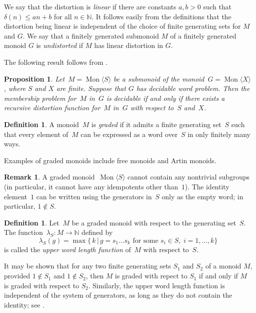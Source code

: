 \documentclass[11pt]{amsart}
\newcommand{\Mgen}[1]{\operatorname{Mon}\bigl\langle #1 \bigr\rangle}
\newcommand{\N}{\mathbb{N}}
\theoremstyle{plain}
\newtheorem{prop}[theorem]{Proposition}
\theoremstyle{definition}
\newtheorem{mydef}[theorem]{Definition}
\newtheorem{remark}[theorem]{Remark}
\begin{document}
We say that the distortion is \emph{linear} if there are constants $a,b>0$ such that $\delta(n) \leq an+b$ for all $n \in \N$. It follows easily from the definitions that the distortion being linear is independent of the choice of finite generating sets for $M$ and $G$. We say that a finitely generated submonoid $M$ of a finitely generated monoid $G$ is \emph{undistorted} if $M$ has linear distortion in $G$.  



The following result follows from 
\cite[Proposition 1.1]{margolis2005distortion}.

\begin{prop}\label{prop: membership problem via distortion}
Let~$M = \Mgen{S}$ be a submonoid of the monoid~$G = \Mgen{X}$, where $S$ and $X$ are finite. 
Suppose that  $G$ has decidable word problem. 
Then the membership problem for~$M$ in~$G$ is decidable if and only if there exists a recursive distortion function for~$M$ in~$G$ with respect to~$S$ and~$X$.
\end{prop}


\begin{mydef}
A monoid~$M$ is \emph{graded} if it admits a finite generating set~$S$ such that every element of~$M$ can be expressed as a word over~$S$ in only finitely many ways.
\end{mydef}
Examples of graded monoids include free monoids and Artin monoids.




\begin{remark}
A graded monoid~$\Mgen{S}$ cannot contain any nontrivial subgroups (in particular, it cannot have any idempotents other than~$1$). The identity element~$1$ can be written using the generators in~$S$ only as the empty word; in particular, $1 \notin S$.
\end{remark}

\begin{mydef}
Let~$M$ be a graded monoid with respect to the generating set~$S$. The function~$\lambda_S \colon M \rightarrow \N$ defined by
\[
\lambda_S(g) = \max\{\,k\,|\, g = s_1 \dots s_k \text{ for some } s_i \in S, \; i = 1, \dots, k\}
\]
is called the \emph{upper word length function} of~$M$ with respect to~$S$.
\end{mydef}

It may be shown that for any two finite generating sets $S_1$ and $S_2$ of a monoid $M$, provided $1 \not\in S_1$ and $1 \not\in S_2$, then $M$ is graded with repect to $S_1$ if and only if $M$ is graded with respect to $S_2$.
Similarly, the upper word length function is independent of the system of generators, as long as they do not contain the identity; see \cite[Proposition~1.6]{margolis2005distortion}. 
\end{document}
